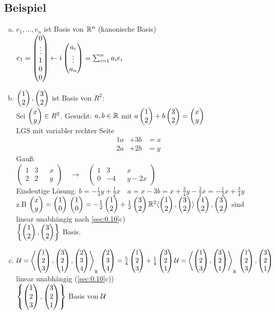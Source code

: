 \subsection{Beispiel}\label{sec:0.14}
\begin{enumerate}[a)]
\item $e_1,\ldots,e_n$ ist Basis von $\R^n$ (kanonische Basis)\\
$e_1 = \begin{pmatrix}
0\\\vdots\\1\\0\\0
\end{pmatrix}\leftarrow i\\
\vektor{a_i}\vdots{a_n} = \sum_{i=1}^{n} a_ie_i$
\item $\vektor12{},\vektor32{}$ ist Basis von $R^2$:\\
Sei $\vektor{x}{y}{}\in R^2$. Gesucht: $a,b \in \R$ mit $a\vektor12{}+b\vektor32{} =\vektor{x}{y}{}$\\
LGS mit variabler rechter Seite\[
\begin{matrix}
1a &+3b&=x\\
2a &+2b&=y
\end{matrix}\]
Gau\ss:\medskip\\
$\begin{pmatrix}
1&3&&x\\
2&2&&y
\end{pmatrix}\quad\rightarrow\quad\begin{pmatrix}
1&3&&x\\
0&-4&&y-2x
\end{pmatrix}$\\
Eindeutige Lösung: $b = -\frac14y+\frac12x\quad a = x-3b = x +\frac34y - \frac32x = -\frac12x + \frac34y$\\
z.B $\vektor{x}{y}{} = \vektor10{}\\
\vektor10{} = -\frac12\vektor12{}+ \frac12\vektor32{}
\R^2 \langle \vektor12{},\vektor32{}\rangle\\
\vektor12{},\vektor32{}$ sind linear unabhängig nach \ref{sec:0.10}c)\\
$\left\{\vektor12{},\vektor32{}\right\}$ Basis.
\item $\U = \left\langle \vektor123,\vektor321,\vektor234\right\rangle_\R\\
\vektor234 = \frac54 \vektor123 + \frac14\vektor321\\
\U = \left\langle \vektor123,\vektor321\right\rangle_\R\\
\vektor123,\vektor321$ linear unabhängig (\ref{sec:0.10}c))\\
$\left\{ \vektor123, \vektor321 \right\}$ Basis von $\U$
\end{enumerate}
